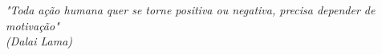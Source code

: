 \begin{epigrafe}
    \vspace*{\fill}
	\begin{flushright}

		\textit{"Toda ação humana quer se torne positiva ou negativa, precisa depender de motivação"\\
		(Dalai Lama)}
	\end{flushright}
\end{epigrafe}
